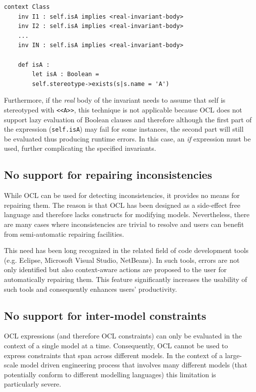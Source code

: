 \begin{lstlisting}[float=t, caption=Demonstration of OCL constraints with duplication, label=lst:OCLDuplication, language=OCL2]
context Class
	inv I1 : self.isA implies <real-invariant-body>
	inv I2 : self.isA implies <real-invariant-body>
	...
	inv IN : self.isA implies <real-invariant-body>
	
	def isA :
		let isA : Boolean = 
		self.stereotype->exists(s|s.name = 'A')
\end{lstlisting}

Furthermore, if the \emph{real} body of the invariant needs to assume that self is stereotyped with \verb|<<A>>|, this technique is not applicable because OCL does not support lazy evaluation of Boolean clauses \cite{OCL} and therefore although the first part of the expression (\verb|self.isA|) may fail for some instances, the second part will still be evaluated thus producing runtime errors. In this case, an \textit{if} expression must be used, further complicating the specified invariants.

\subsection{No support for repairing inconsistencies} 
\label{sec:Issue5}
While OCL can be used for detecting inconsistencies, it provides no means for repairing them. The reason is that OCL has been designed as a side-effect free language and therefore lacks constructs for modifying models. Nevertheless, there are many cases where inconsistencies are trivial to resolve and users can benefit from semi-automatic repairing facilities. 

This need has been long recognized in the related field of code development tools (e.g. Eclipse, Microsoft Visual Studio, NetBeans). In such tools, errors are not only identified but also context-aware actions are proposed to the user for automatically repairing them. This feature significantly increases the usability of such tools and consequently enhances users' productivity.\\

\subsection{No support for inter-model constraints}
\label{sec:Issue6}
OCL expressions (and therefore OCL constraints) can only be evaluated in the context of a single model at a time. Consequently, OCL cannot be used to express constraints that span across different models. In the context of a large-scale model driven engineering process that involves many different models (that potentially conform to different modelling languages) this limitation is particularly severe.\\

